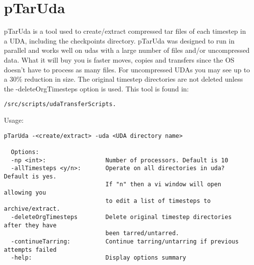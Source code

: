 \section{pTarUda}
pTarUda is a tool used to create/extract compressed tar files of each timestep in a UDA, including the checkpoints directory. pTarUda was designed to run in parallel and works well on udas with a large number of files and/or uncompressed data.  What it will buy you is faster moves, copies and transfers since the OS doesn't have to process as many files.  For uncompressed UDAs you may see up to a 30\% reduction in size. The original timestep directories are not deleted unless the -deleteOrgTimesteps option is used. This tool is found in:
\begin{Verbatim}[fontsize=\footnotesize]
    /src/scripts/udaTransferScripts.
\end{Verbatim}
%
Usage:
\begin{Verbatim}[fontsize=\footnotesize]
pTarUda -<create/extract> -uda <UDA directory name>

  Options:
  -np <int>:                 Number of processors. Default is 10                           
  -allTimesteps <y/n>:       Operate on all directories in uda? Default is yes.            
                             If "n" then a vi window will open allowing you                
                             to edit a list of timesteps to archive/extract.               
  -deleteOrgTimesteps        Delete original timestep directories after they have          
                             been tarred/untarred.                                         
  -continueTarring:          Continue tarring/untarring if previous attempts failed        
  -help:                     Display options summary                                       
\end{Verbatim}
\normalsize



